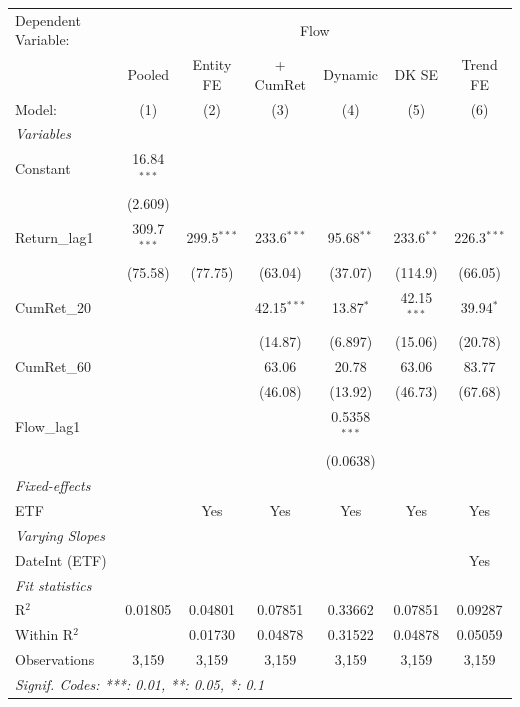 
\begingroup
\centering
\begin{tabular}{lcccccc}
   \tabularnewline \midrule \midrule
   Dependent Variable: & \multicolumn{6}{c}{Flow}\\
                 & Pooled        & Entity FE     & + CumRet      & Dynamic        & DK SE         & Trend FE \\   
   Model:        & (1)           & (2)           & (3)           & (4)            & (5)           & (6)\\  
   \midrule
   \emph{Variables}\\
   Constant      & 16.84$^{***}$ &               &               &                &               &   \\   
                 & (2.609)       &               &               &                &               &   \\   
   Return\_lag1  & 309.7$^{***}$ & 299.5$^{***}$ & 233.6$^{***}$ & 95.68$^{**}$   & 233.6$^{**}$  & 226.3$^{***}$\\   
                 & (75.58)       & (77.75)       & (63.04)       & (37.07)        & (114.9)       & (66.05)\\   
   CumRet\_20    &               &               & 42.15$^{***}$ & 13.87$^{*}$    & 42.15$^{***}$ & 39.94$^{*}$\\   
                 &               &               & (14.87)       & (6.897)        & (15.06)       & (20.78)\\   
   CumRet\_60    &               &               & 63.06         & 20.78          & 63.06         & 83.77\\   
                 &               &               & (46.08)       & (13.92)        & (46.73)       & (67.68)\\   
   Flow\_lag1    &               &               &               & 0.5358$^{***}$ &               &   \\   
                 &               &               &               & (0.0638)       &               &   \\   
   \midrule
   \emph{Fixed-effects}\\
   ETF           &               & Yes           & Yes           & Yes            & Yes           & Yes\\  
   \midrule
   \emph{Varying Slopes}\\
   DateInt (ETF) &               &               &               &                &               & Yes\\  
   \midrule
   \emph{Fit statistics}\\
   R$^2$         & 0.01805       & 0.04801       & 0.07851       & 0.33662        & 0.07851       & 0.09287\\  
   Within R$^2$  &               & 0.01730       & 0.04878       & 0.31522        & 0.04878       & 0.05059\\  
   Observations  & 3,159         & 3,159         & 3,159         & 3,159          & 3,159         & 3,159\\  
   \midrule \midrule
   \multicolumn{7}{l}{\emph{Signif. Codes: ***: 0.01, **: 0.05, *: 0.1}}\\
\end{tabular}
\par\endgroup


